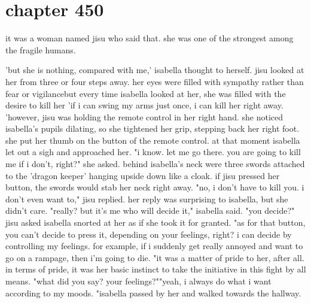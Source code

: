 \section{chapter 450}

it was a woman named jisu who said that.
 she was one of the strongest among the fragile humans.





'but she is nothing, compared with me,' isabella thought to herself.
 jisu looked at her from three or four steps away.
 her eyes were filled with sympathy rather than fear or vigilancebut every time isabella looked at her, she was filled with the desire to kill her 'if i can swing my arms just once, i can kill her right away.
'however, jisu was holding the remote control in her right hand.
 she noticed isabella's pupils dilating, so she tightened her grip, stepping back her right foot.
she put her thumb on the button of the remote control.
at that moment isabella let out a sigh and approached her.
"i know.
 let me go there.
 you are going to kill me if i don't, right?" she asked.
 behind isabella's neck were three swords attached to the 'dragon keeper' hanging upside down like a cloak.
if jisu pressed her button, the swords would stab her neck right away.
 "no, i don't have to kill you.
 i don't even want to," jisu replied.
 her reply was surprising to isabella, but she didn't care.
"really? but it's me who will decide it," isabella said.
 "you decide?" jisu asked isabella snorted at her as if she took it for granted.
 "as for that button, you can't decide to press it, depending on your feelings, right? i can decide by controlling my feelings.
 for example, if i suddenly get really annoyed and want to go on a rampage, then i'm going to die.
"it was a matter of pride to her, after all.
 in terms of pride, it was her basic instinct to take the initiative in this fight by all means.
"what did you say? your feelings?""yeah, i always do what i want according to my moods.
"isabella passed by her and walked towards the hallway.


